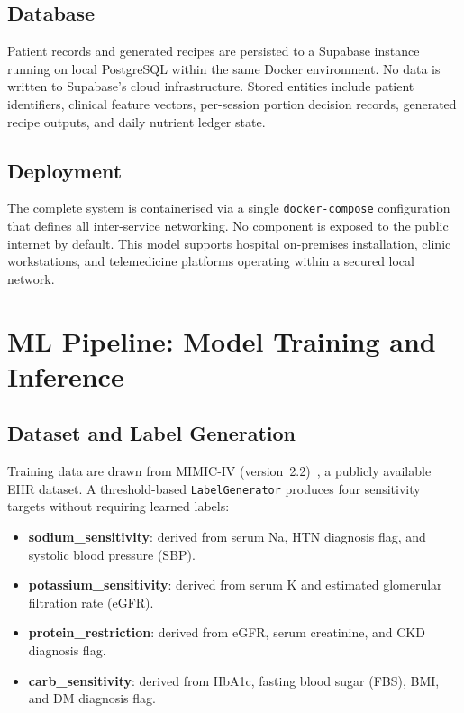 \documentclass[journal]{IEEEtran}
\begin{document}
\subsection{Database}
Patient records and generated recipes are persisted to a Supabase
instance running on local PostgreSQL within the same Docker environment.
No data is written to Supabase's cloud infrastructure. Stored entities
include patient identifiers, clinical feature vectors, per-session
portion decision records, generated recipe outputs, and daily nutrient
ledger state.

\subsection{Deployment}
The complete system is containerised via a single \texttt{docker-compose}
configuration that defines all inter-service networking. No component is
exposed to the public internet by default. This model supports hospital
on-premises installation, clinic workstations, and telemedicine platforms
operating within a secured local network.

\section{ML Pipeline: Model Training and Inference}
\label{sec:mlpipeline}

\subsection{Dataset and Label Generation}

Training data are drawn from MIMIC-IV (version~2.2)~\cite{mimic2023},
a publicly available EHR dataset. A threshold-based \texttt{LabelGenerator}
produces four sensitivity targets without requiring learned labels:

\begin{itemize}
    \item \textbf{sodium\_sensitivity}: derived from serum Na,
    HTN diagnosis flag, and systolic blood pressure (SBP).
    \item \textbf{potassium\_sensitivity}: derived from serum K and
    estimated glomerular filtration rate (eGFR).
    \item \textbf{protein\_restriction}: derived from eGFR, serum
    creatinine, and CKD diagnosis flag.
    \item \textbf{carb\_sensitivity}: derived from HbA1c, fasting blood
    sugar (FBS), BMI, and DM diagnosis flag.
\end{itemize}
\end{document}
